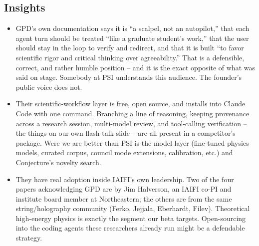\documentclass[11pt]{article}
\begin{document}
\subsection*{Insights}
\begin{itemize}
    \item GPD's own documentation says it is ``a scalpel, not an autopilot,'' that each agent turn should be treated ``like a graduate student's work,'' that the user should stay in the loop to verify and redirect, and that it is built ``to favor scientific rigor and critical thinking over agreeability.'' That is a defensible, correct, and rather humble position -- and it is the exact opposite of what was said on stage. Somebody at PSI understands this audience. The founder's public voice does not.
    \item Their scientific-workflow layer is free, open source, and installs into Claude Code with one command. Branching a line of reasoning, keeping provenance across a research session, multi-model review, and tool-calling verification -- the things on our own flash-talk slide -- are all present in a competitor's package. Were we are better than PSI is the model layer (fine-tuned physics models, curated corpus, council mode extensions, calibration, etc.) and Conjecture's novelty search.
    \item They have real adoption inside IAIFI's own leadership. Two of the four papers acknowledging GPD are by Jim Halverson, an IAIFI co-PI and institute board member at Northeastern; the others are from the same string/holography community (Ferko, Jejjala, Eberhardt, Filev). Theoretical high-energy physics is exactly the segment our beta targets. Open-sourcing into the coding agents these researchers already run might be a defendable strategy.
\end{itemize}
\end{document}
